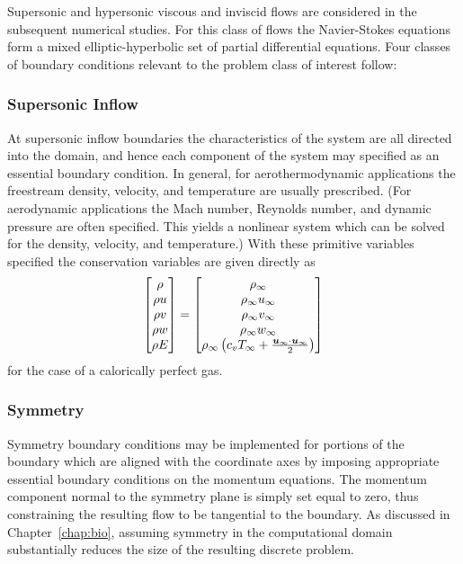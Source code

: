 Supersonic and hypersonic viscous and inviscid flows are considered in the subsequent numerical studies.  For this class of flows the Navier-Stokes equations form a mixed elliptic-hyperbolic set of partial differential equations.  Four classes of boundary conditions relevant to the problem class of interest follow:

\subsubsection{Supersonic Inflow}
At supersonic inflow boundaries the characteristics of the system are all directed into the domain, and hence each component of the system may specified as an essential boundary condition.  In general, for aerothermodynamic applications the freestream density, velocity, and temperature are usually prescribed. (For aerodynamic applications the Mach number, Reynolds number, and dynamic pressure are often specified.  This yields a nonlinear system which can be solved for the density, velocity, and temperature.)  With these primitive variables specified the conservation variables are given directly as
\begin{equation*}
  \begin{bmatrix}
    \rho   \\
    \rho u \\
    \rho v \\
    \rho w \\
    \rho E   
  \end{bmatrix} =
  \begin{bmatrix}
    \rho_\infty \\								      
    \rho_\infty u_\infty \\							      
    \rho_\infty v_\infty \\							      
    \rho_\infty w_\infty \\							      
    \rho_\infty \left(c_v T_\infty + \frac{{\boldsymbol{u}}_\infty\cdot{\boldsymbol{u}}_\infty}{2}\right)      
  \end{bmatrix}  
\end{equation*}
for the case of a calorically perfect gas.

\subsubsection{Symmetry}
Symmetry boundary conditions may be implemented for portions of the boundary which are aligned with the coordinate axes by imposing appropriate essential boundary conditions on the momentum equations.  The momentum component normal to the symmetry plane is simply set equal to zero, thus constraining the resulting flow to be tangential to the boundary.  As discussed in Chapter~\ref{chap:bio}, assuming symmetry in the computational domain substantially reduces the size of the resulting discrete problem.


